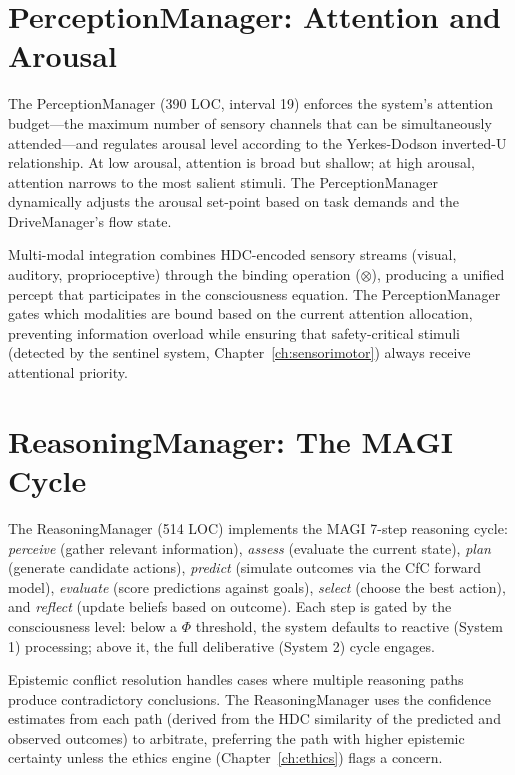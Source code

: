 \documentclass[12pt]{book}
\newcommand{\bind}{\otimes}
\begin{document}
\section{PerceptionManager: Attention and Arousal}

The PerceptionManager (390 LOC, interval 19) enforces the system's attention budget---the maximum number of sensory channels that can be simultaneously attended---and regulates arousal level according to the Yerkes-Dodson inverted-U relationship. At low arousal, attention is broad but shallow; at high arousal, attention narrows to the most salient stimuli. The PerceptionManager dynamically adjusts the arousal set-point based on task demands and the DriveManager's flow state.

Multi-modal integration combines HDC-encoded sensory streams (visual, auditory, proprioceptive) through the binding operation ($\bind$), producing a unified percept that participates in the consciousness equation. The PerceptionManager gates which modalities are bound based on the current attention allocation, preventing information overload while ensuring that safety-critical stimuli (detected by the sentinel system, Chapter~\ref{ch:sensorimotor}) always receive attentional priority.

\section{ReasoningManager: The MAGI Cycle}

The ReasoningManager (514 LOC) implements the MAGI 7-step reasoning cycle: \textit{perceive} (gather relevant information), \textit{assess} (evaluate the current state), \textit{plan} (generate candidate actions), \textit{predict} (simulate outcomes via the CfC forward model), \textit{evaluate} (score predictions against goals), \textit{select} (choose the best action), and \textit{reflect} (update beliefs based on outcome). Each step is gated by the consciousness level: below a $\Phi$ threshold, the system defaults to reactive (System 1) processing; above it, the full deliberative (System 2) cycle engages.

Epistemic conflict resolution handles cases where multiple reasoning paths produce contradictory conclusions. The ReasoningManager uses the confidence estimates from each path (derived from the HDC similarity of the predicted and observed outcomes) to arbitrate, preferring the path with higher epistemic certainty unless the ethics engine (Chapter~\ref{ch:ethics}) flags a concern.
\end{document}
